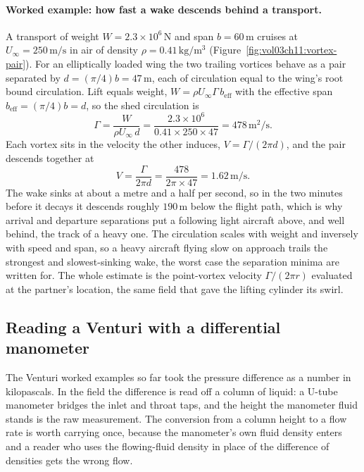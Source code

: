 

\paragraph{Worked example: how fast a wake descends behind a
transport.} A transport of weight $W = 2.3\times 10^6\,\si{\newton}$
and span $b = 60\,\si{\meter}$ cruises at $U_\infty =
250\,\si{\meter\per\second}$ in air of density $\rho =
0.41\,\si{\kilogram\per\meter\cubed}$
(Figure~\ref{fig:vol03ch11:vortex-pair}). For an elliptically loaded
wing the two trailing vortices behave as a pair separated by $d =
(\pi/4)b = 47\,\si{\meter}$, each of circulation equal to the wing's
root bound circulation. Lift equals weight, $W = \rho U_\infty\Gamma\,
b_\text{eff}$ with the effective span $b_\text{eff} = (\pi/4)b = d$, so
the shed circulation is
\[
\Gamma = \frac{W}{\rho U_\infty\,d}
= \frac{2.3\times 10^6}{0.41\times 250\times 47}
= 478\,\si{\meter\squared\per\second}.
\]
Each vortex sits in the velocity the other induces, $V = \Gamma/(2\pi
d)$, and the pair descends together at
\[
V = \frac{\Gamma}{2\pi d}
= \frac{478}{2\pi\times 47}
= 1.62\,\si{\meter\per\second}.
\]
The wake sinks at about a metre and a half per second, so in the two
minutes before it decays it descends roughly $190\,\si{\meter}$ below
the flight path, which is why arrival and departure separations put a
following light aircraft above, and well behind, the track of a heavy
one. The circulation scales with weight and inversely with speed and
span, so a heavy aircraft flying slow on approach trails the strongest
and slowest-sinking wake, the worst case the separation minima are
written for. The whole estimate is the point-vortex velocity $\Gamma/
(2\pi r)$ evaluated at the partner's location, the same field that gave
the lifting cylinder its swirl.

\subsection{Reading a Venturi with a differential manometer}

The Venturi worked examples so far took the pressure difference as a
number in kilopascals. In the field the difference is read off a
column of liquid: a U-tube manometer bridges the inlet and throat taps,
and the height the manometer fluid stands is the raw measurement. The
conversion from a column height to a flow rate is worth carrying once,
because the manometer's own fluid density enters and a reader who uses
the flowing-fluid density in place of the difference of densities gets
the wrong flow.


